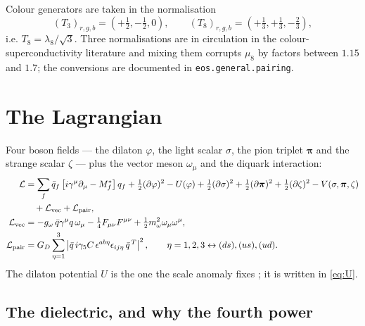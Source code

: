 \documentclass[11pt,a4paper]{article}
\newcommand{\Mstar}{M^{*}}
\newcommand{\code}[1]{\texttt{#1}}
\begin{document}
Colour generators are taken in the normalisation
\begin{equation}
(T_3)_{r,g,b}=\left(+\tfrac12,-\tfrac12,0\right),
\qquad
(T_8)_{r,g,b}=\left(+\tfrac13,+\tfrac13,-\tfrac23\right),
\end{equation}
i.e. $T_8=\lambda_8/\sqrt3$. Three normalisations are in circulation in the
colour-superconductivity literature and mixing them corrupts $\mu_8$ by factors
between $1.15$ and $1.7$; the conversions are documented in
\code{eos.general.pairing}.

\section{The Lagrangian}

Four boson fields --- the dilaton $\varphi$, the light scalar $\sigma$, the
pion triplet $\bm\pi$ and the strange scalar $\zeta$ --- plus the vector meson
$\omega_\mu$ and the diquark interaction:
\begin{align}
\mathcal L &= \sum_f \bar q_f\left[i\gamma^\mu\partial_\mu - \Mstar_f\right]q_f
 + \tfrac12(\partial\varphi)^2 - U(\varphi)
 + \tfrac12(\partial\sigma)^2 + \tfrac12(\partial\bm\pi)^2
 + \tfrac12(\partial\zeta)^2 - V(\sigma,\bm\pi,\zeta) \nonumber\\
&\quad + \mathcal L_{\rm vec} + \mathcal L_{\rm pair},
\\
\mathcal L_{\rm vec} &= -g_\omega\,\bar q\gamma^\mu q\,\omega_\mu
 - \tfrac14 F_{\mu\nu}F^{\mu\nu} + \tfrac12 m_\omega^2\omega_\mu\omega^\mu,
\\
\mathcal L_{\rm pair} &= G_D\sum_{\eta=1}^{3}
 \left|\bar q\,i\gamma_5 C\,\epsilon^{ab\eta}\epsilon_{ij\eta}\,\bar q^{\,T}\right|^2,
\qquad \eta=1,2,3 \leftrightarrow (ds),(us),(ud).
\end{align}
The dilaton potential $U$ is the one the scale anomaly fixes
\cite{Schechter1980,MigdalShifman1982}; it is written in \eqref{eq:U}.

\subsection{The dielectric, and why the fourth power}
\end{document}
